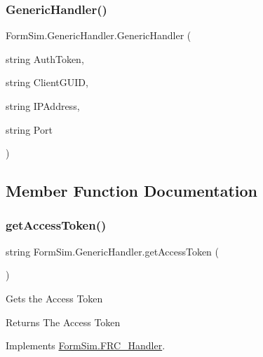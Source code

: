 \subsubsection{\texorpdfstring{Generic\+Handler()}{GenericHandler()}\hspace{0.1cm}{\footnotesize\ttfamily [3/3]}}
{\footnotesize\ttfamily Form\+Sim.\+Generic\+Handler.\+Generic\+Handler (\begin{DoxyParamCaption}\item[{string}]{Auth\+Token,  }\item[{string}]{Client\+G\+U\+ID,  }\item[{string}]{I\+P\+Address,  }\item[{string}]{Port }\end{DoxyParamCaption})\hspace{0.3cm}{\ttfamily [inline]}}



\subsection{Member Function Documentation}
\mbox{\label{class_form_sim_1_1_generic_handler_a220e1a96282940bc7b2fe8d898aec987}} 
\subsubsection{\texorpdfstring{get\+Access\+Token()}{getAccessToken()}}
{\footnotesize\ttfamily string Form\+Sim.\+Generic\+Handler.\+get\+Access\+Token (\begin{DoxyParamCaption}{ }\end{DoxyParamCaption})\hspace{0.3cm}{\ttfamily [inline]}}



Gets the Access Token 

\begin{DoxyReturn}{Returns}
The Access Token
\end{DoxyReturn}


Implements \mbox{\hyperlink{interface_form_sim_1_1_f_r_c___handler_ad24521be35d127e83221c3c7ecf6fbf8}{Form\+Sim.\+F\+R\+C\+\_\+\+Handler}}.

\mbox{\label{class_form_sim_1_1_generic_handler_a4854fdfe77d09a6d2af723d2811099f5}} 
